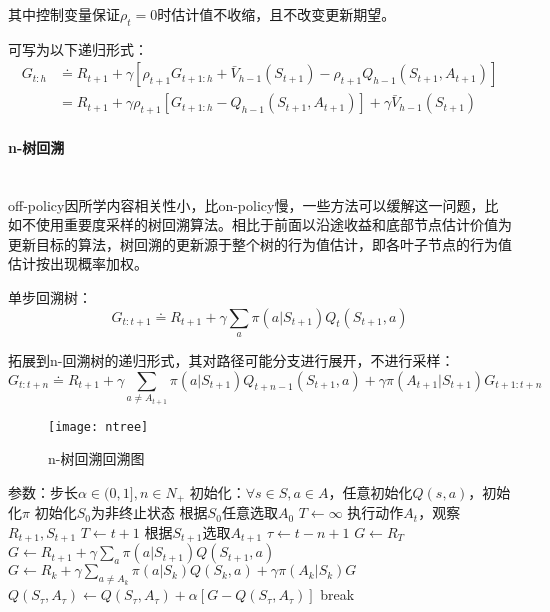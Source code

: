 \documentclass[
12pt, %
a4paper, 
oneside, %
headinclude,footinclude, %
]{scrartcl}
\begin{document}
其中控制变量保证$ \rho_t = 0 $时估计值不收缩，且不改变更新期望。

可写为以下递归形式：
\begin{align*}
G_{t:h} 
&\doteq R_{t + 1} + \gamma[\rho_{t + 1} G_{t + 1:h} + \bar{V}_{h - 1}(S_{t + 1}) - \rho_{t + 1} Q_{h - 1}(S_{t + 1}, A_{t + 1})] \\
&= R_{t + 1} + \gamma \rho_{t + 1}[G_{t + 1:h} - Q_{h - 1}(S_{t + 1}, A_{t + 1})] + \gamma \bar{V}_{h - 1}(S_{t + 1})
\end{align*}
\paragraph{n-树回溯}~\\

off-policy因所学内容相关性小，比on-policy慢，一些方法可以缓解这一问题，比如不使用重要度采样的树回溯算法。相比于前面以沿途收益和底部节点估计价值为更新目标的算法，树回溯的更新源于整个树的行为值估计，即各叶子节点的行为值估计按出现概率加权。

单步回溯树：
$$ G_{t:t + 1} \doteq R_{t + 1} + \gamma \sum_{a} \pi(a|S_{t + 1}) Q_t(S_{t + 1}, a) $$

拓展到n-回溯树的递归形式，其对路径可能分支进行展开，不进行采样：
$$ G_{t:t + n} \doteq R_{t + 1} + \gamma \sum_{a \neq A_{t + 1}} \pi(a|S_{t + 1}) Q_{t + n - 1}(S_{t + 1}, a) + \gamma \pi(A_{t + 1}|S_{t + 1}) G_{t + 1:t + n} $$

\begin{figure}[H]
\centering
\texttt{[image: ntree]}
\caption[n-树回溯回溯图]{n-树回溯回溯图}
\end{figure}
\begin{myalgorithm}[n-树回溯]
\State 参数：步长$ \alpha \in (0,1], n \in N_+ $
\State 初始化：$ \forall s \in S, a \in A $，任意初始化$ Q(s, a) $，初始化$ \pi $
\State 初始化$ S_0 $为非终止状态
\State 根据$ S_0 $任意选取$ A_0 $
\State $ T \gets \infty $
\State 执行动作$ A_t $，观察$ R_{t + 1},S_{t + 1} $
\State $ T \gets t + 1 $
\Else
\State 根据$ S_{t + 1} $选取$ A_{t + 1} $
\EndIf
\EndIf
\State $ \tau \gets t - n + 1 $ 
\State $ G \gets R_T $ 
\Else
\State $ G \gets R_{t + 1} + \gamma \sum_a \pi(a|S_{t + 1})Q(S_{t + 1}, a) $
\EndIf
{}
\State $ G \gets R_k + \gamma \sum_{a \neq A_k} \pi(a|S_k)Q(S_k,a) + \gamma \pi(A_k|S_k)G $
\EndFor
\State $ Q(S_{\tau}, A_{\tau}) \gets Q(S_{\tau}, A_{\tau}) + \alpha[G - Q(S_{\tau}, A_{\tau})] $
\EndIf
{}
\State break
\EndIf
\EndFor
\EndFor
\end{myalgorithm}
\end{document}
